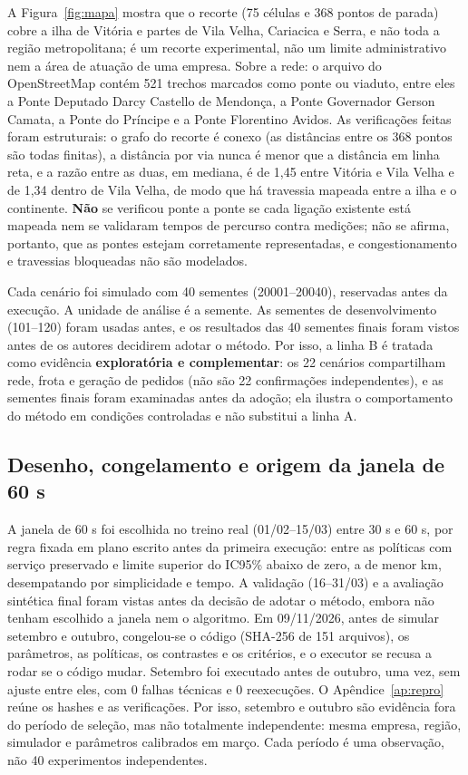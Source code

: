 A Figura~\ref{fig:mapa} mostra que o recorte (75 células e 368 pontos de parada) cobre a ilha de Vitória e partes de Vila Velha, Cariacica e Serra, e não toda a região metropolitana; é um recorte experimental, não um limite administrativo nem a área de atuação de uma empresa. Sobre a rede: o arquivo do OpenStreetMap contém 521 trechos marcados como ponte ou viaduto, entre eles a Ponte Deputado Darcy Castello de Mendonça, a Ponte Governador Gerson Camata, a Ponte do Príncipe e a Ponte Florentino Avidos. As verificações feitas foram estruturais: o grafo do recorte é conexo (as distâncias entre os 368 pontos são todas finitas), a distância por via nunca é menor que a distância em linha reta, e a razão entre as duas, em mediana, é de 1,45 entre Vitória e Vila Velha e de 1,34 dentro de Vila Velha, de modo que há travessia mapeada entre a ilha e o continente. \textbf{Não} se verificou ponte a ponte se cada ligação existente está mapeada nem se validaram tempos de percurso contra medições; não se afirma, portanto, que as pontes estejam corretamente representadas, e congestionamento e travessias bloqueadas não são modelados.

Cada cenário foi simulado com 40 sementes (20001--20040), reservadas antes da execução. A unidade de análise é a semente. As sementes de desenvolvimento (101--120) foram usadas antes, e os resultados das 40 sementes finais foram vistos antes de os autores decidirem adotar o método. Por isso, a linha B é tratada como evidência \textbf{exploratória e complementar}: os 22 cenários compartilham rede, frota e geração de pedidos (não são 22 confirmações independentes), e as sementes finais foram examinadas antes da adoção; ela ilustra o comportamento do método em condições controladas e não substitui a linha A.

\subsection{Desenho, congelamento e origem da janela de 60 s}

A janela de 60 s foi escolhida no treino real (01/02--15/03) entre 30 s e 60 s, por regra fixada em plano escrito antes da primeira execução: entre as políticas com serviço preservado e limite superior do IC95\% abaixo de zero, a de menor km, desempatando por simplicidade e tempo. A validação (16--31/03) e a avaliação sintética final foram vistas antes da decisão de adotar o método, embora não tenham escolhido a janela nem o algoritmo. Em 09/11/2026, antes de simular setembro e outubro, congelou-se o código (SHA-256 de 151 arquivos), os parâmetros, as políticas, os contrastes e os critérios, e o executor se recusa a rodar se o código mudar. Setembro foi executado antes de outubro, uma vez, sem ajuste entre eles, com 0 falhas técnicas e 0 reexecuções. O Apêndice~\ref{ap:repro} reúne os hashes e as verificações. Por isso, setembro e outubro são evidência fora do período de seleção, mas não totalmente independente: mesma empresa, região, simulador e parâmetros calibrados em março. Cada período é uma observação, não 40 experimentos independentes.

